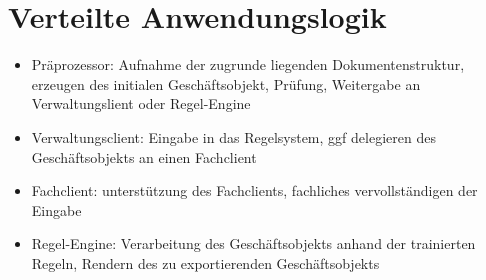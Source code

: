 \chapter{Verteilte Anwendungslogik}
%
\begin{itemize}
\item Präprozessor: Aufnahme der zugrunde liegenden Dokumentenstruktur, erzeugen des initialen Geschäftsobjekt, Prüfung, Weitergabe an Verwaltungslient oder Regel-Engine
\item Verwaltungsclient: Eingabe in das Regelsystem, ggf delegieren des Geschäftsobjekts an einen Fachclient
\item Fachclient: unterstützung des Fachclients, fachliches vervollständigen der Eingabe
\item Regel-Engine: Verarbeitung des Geschäftsobjekts anhand der trainierten Regeln, Rendern des zu exportierenden Geschäftsobjekts
\end{itemize}